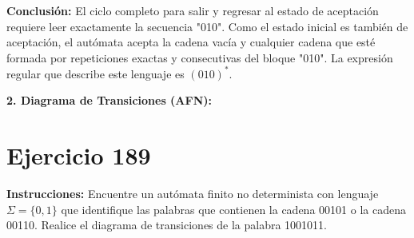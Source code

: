 \documentclass[12pt]{article}
\begin{document}
\vspace{0.3cm}
\textbf{Conclusión:} El ciclo completo para salir y regresar al estado de aceptación requiere leer exactamente la secuencia "010". Como el estado inicial es también de aceptación, el autómata acepta la cadena vacía y cualquier cadena que esté formada por repeticiones exactas y consecutivas del bloque "010". La expresión regular que describe este lenguaje es $(010)^{*}$.

\vspace{0.5cm}

\textbf{2. Diagrama de Transiciones (AFN):}

\begin{center}
\end{center}

\section*{Ejercicio 189}

\textbf{Instrucciones:} Encuentre un autómata finito no determinista con lenguaje $\Sigma=\{0,1\}$ que identifique las palabras que contienen la cadena 00101 o la cadena 00110. Realice el diagrama de transiciones de la palabra 1001011.

\vspace{0.5cm}
\end{document}
